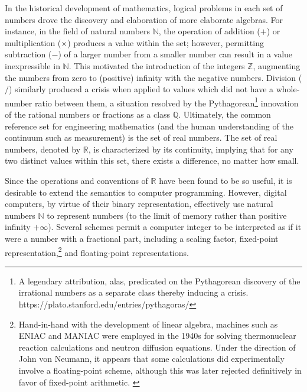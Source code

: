 \documentclass[twoside]{article}
\begin{document}
In the historical development of mathematics, logical problems in each set of numbers drove the discovery and elaboration of more elaborate algebras.  For instance, in the field of natural numbers $\mathbb{N}$, the operation of addition ($+$) or multiplication ($\times$) produces a value within the set; however, permitting subtraction ($-$) of a larger number from a smaller number can result in a value inexpressible in $\mathbb{N}$.  This motivated the introduction of the integers $\mathbb{Z}$, augmenting the numbers from zero to (positive) infinity with the negative numbers.  Division ($/$) similarly produced a crisis when applied to values which did not have a whole-number ratio between them, a situation resolved by the Pythagorean\footnote{A legendary attribution, alas, predicated on the Pythagorean discovery of the irrational numbers as a separate class thereby inducing a crisis.  https://plato.stanford.edu/entries/pythagoras/} innovation of the rational numbers or fractions as a class $\mathbb{Q}$.  Ultimately, the common reference set for engineering mathematics (and the human understanding of the continuum such as measurement) is the set of real numbers.  The set of real numbers, denoted by $\mathbb{R}$, is characterized by its continuity, implying that for any two distinct values within this set, there exists a difference, no matter how small.

Since the operations and conventions of $\mathbb{R}$ have been found to be so useful, it is desirable to extend the semantics to computer programming.  However, digital computers, by virtue of their binary representation, effectively use natural numbers $\mathbb{N}$ to represent numbers (to the limit of memory rather than positive infinity $+\infty$).  Several schemes permit a computer integer to be interpreted as if it were a number with a fractional part, including a scaling factor, fixed-point representation,\footnote{Hand-in-hand with the development of linear algebra, machines such as ENIAC and MANIAC were employed in the 1940s for solving thermonuclear reaction calculations and neutron diffusion equations.  Under the direction of John von Neumann, it appears that some calculations did experimentally involve a floating-point scheme, although this was later rejected definitively in favor of fixed-point arithmetic.  \citep[p.~3]{Kahan1997a}} and floating-point representations.
\end{document}
